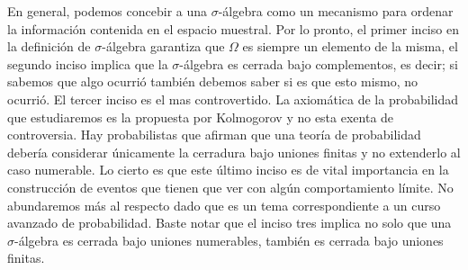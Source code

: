 \documentclass[14pt]{extreport}
\begin{document}
En general, podemos concebir a una $\sigma$-álgebra como un mecanismo para ordenar la información contenida en el espacio muestral. Por lo pronto, el primer inciso en la definición de $\sigma$-álgebra garantiza que $\Omega$ es siempre un elemento de la misma, el segundo inciso implica que la $\sigma$-álgebra es cerrada bajo complementos, es decir; si sabemos que algo ocurrió también debemos saber si es que esto mismo, no ocurrió. El tercer inciso es el mas controvertido. La axiomática de la probabilidad que estudiaremos es la propuesta por Kolmogorov y no esta exenta de controversia. Hay probabilistas que afirman que una teoría de probabilidad debería considerar únicamente la cerradura bajo uniones finitas y no extenderlo al caso numerable. Lo cierto es que este último inciso es de vital importancia en la construcción de eventos que tienen que ver con algún comportamiento límite. No abundaremos más al respecto dado que es un tema correspondiente a un curso avanzado de probabilidad. Baste notar que el inciso tres implica no solo que una $\sigma$-álgebra es cerrada bajo uniones numerables, también es cerrada bajo uniones finitas. 
\end{document}
